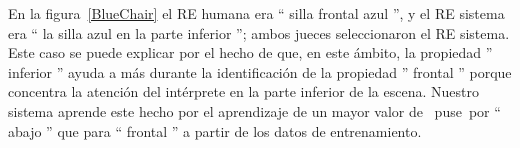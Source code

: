 
En la figura~\ref{BlueChair}  el RE humana era `` silla frontal azul '', y el RE sistema era `` la silla azul en la parte inferior ''; ambos jueces seleccionaron el RE sistema. Este caso se puede explicar por el hecho de que, en este \'ambito, la propiedad '' inferior '' ayuda a m\'as durante la identificaci\'on de la propiedad '' frontal '' porque concentra la atenci\'on del int\'erprete en la parte inferior de la escena. Nuestro sistema aprende este hecho por el aprendizaje de un mayor valor de \ puse~por `` abajo '' que para `` frontal '' a partir de los datos de entrenamiento.

